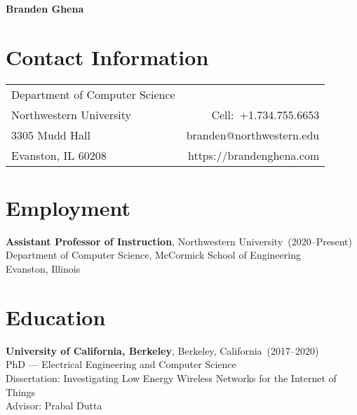 \documentclass{article}
\begin{document}

\nocite{*}

\begin{center}
    \Huge{\bf{Branden Ghena}} \\
\end{center}

\section*{Contact Information}

\begin{table}[H]
\centering
\vspace*{-16pt}
\begin{tabularx}{\linewidth}{@{} X r @{}}
    {Department of Computer Science}     & {} \\
    {Northwestern University}   & {Cell:~+1.734.755.6653} \\
    {3305 Mudd Hall} & {branden@northwestern.edu} \\
    {Evanston, IL 60208} & {https://brandenghena.com} \\
\end{tabularx}
\end{table}

\section*{Employment}
\vspace{-6pt}

{\bf Assistant Professor of Instruction}, Northwestern University~(2020--Present) \\
Department of Computer Science, McCormick School of Engineering \\
Evanston, Illinois


\section*{Education}
\vspace{-6pt}

{\bf University of California, Berkeley}, Berkeley, California~(2017--2020) \\
PhD --- Electrical Engineering and Computer Science \\
Dissertation: Investigating Low Energy Wireless Networks for the Internet of Things \\
Advisor: Prabal Dutta
\end{document}
